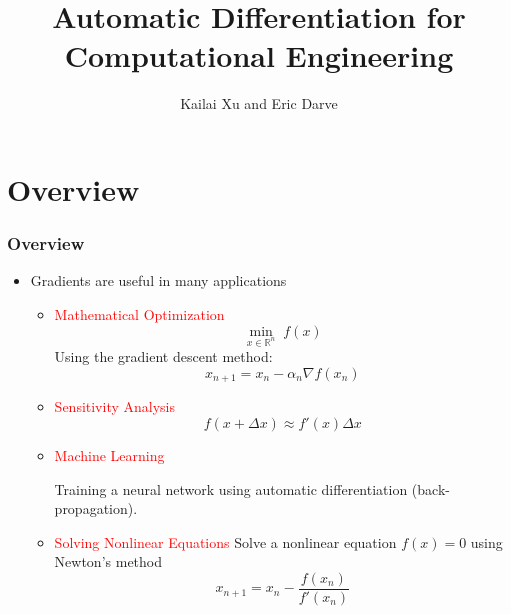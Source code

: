 \documentclass{beamer}
\title[AD]{Automatic Differentiation for Computational Engineering} %
\author[CME 216]{Kailai Xu and Eric Darve} %
\date{}%
\newcommand{\red}[1]{\textcolor{red}{#1}}
\newcommand{\RR}[0]{\mathbb{R}}
\begin{document}
\begin{frame}

	\titlepage %

\end{frame}

\section{Overview}

\begin{frame}
	\frametitle{Overview}

	\begin{itemize}
		\item Gradients are useful in many applications
		      \begin{itemize}
			      \item \red{Mathematical Optimization}
			            $$\min_{x\in\RR^n} \; f(x)$$
			            Using the gradient descent method:
			            $$x_{n+1} = x_n - \alpha_n \nabla f(x_n)$$
			      \item \red{Sensitivity Analysis}
			            $$f(x+\Delta x) \approx f'(x) \Delta x$$
			      \item  \red{Machine Learning}

			            Training a neural network using automatic differentiation (back-propagation).
			      \item \red{Solving Nonlinear Equations} Solve a nonlinear equation $f(x) = 0$ using Newton's method
			            $$x_{n+1} = x_n - \frac{f(x_n)}{f'(x_n)}$$
		      \end{itemize}

	\end{itemize}
\end{frame}
\end{document}
